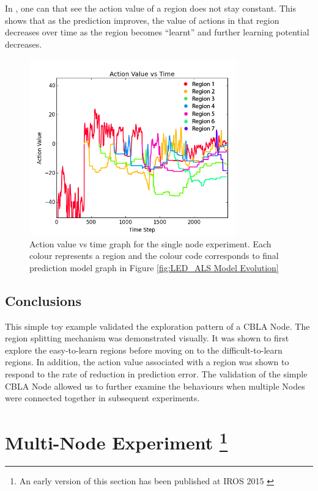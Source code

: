 In , one can that see the action value of a region does not stay constant. This shows that as the prediction improves, the value of actions in that region decreases over time as the region becomes “learnt” and further learning potential decreases. 

\begin{figure} [!htb]
	\centering
	\includegraphics[width=0.8\textwidth]{"fig/validations/LED_ALS Action Value vs Time"}
	\caption[Action value vs time graph for the single node experiment]{Action value vs time graph for the single node experiment. Each colour represents a region and the colour code corresponds to final prediction model graph in Figure \ref{fig:LED_ALS Model Evolution} }
	\label{fig:LED_ALS Action Value vs Time}
\end{figure}


\subsection{Conclusions}

This simple toy example validated the exploration pattern of a CBLA Node. The region splitting mechanism was demonstrated visually. It was shown to first explore the easy-to-learn regions before moving on to the difficult-to-learn regions. In addition, the action value associated with a region was shown to respond to the rate of reduction in prediction error. The validation of the simple CBLA Node allowed us to further examine the behaviours when multiple Nodes were connected together in subsequent experiments.

\FloatBarrier

\section[Multi-Node Experiment]
{Multi-Node Experiment
	\footnote{An early version of this section has been published at IROS 2015 \cite{Chan2015} }}\label{sec:multi-node}


